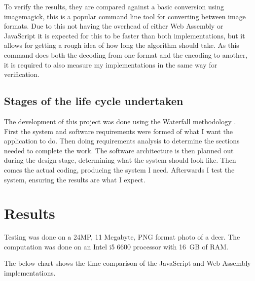 \documentclass[12pt,a4paper]{article}
\begin{document}
To verify the results, they are compared against a basic conversion using imagemagick, this is a popular command line tool for converting between image formats. Due to this not having the overhead of either Web Assembly or JavaScript it is expected for this to be faster than both implementations, but it allows for getting a rough idea of how long the algorithm should take. As this command does both the decoding from one format and the encoding to another, it is required to also measure my implementations in the same way for verification.

\subsection{Stages of the life cycle undertaken}

The development of this project was done using the Waterfall methodology \cite{royce1987managing}. First the system and software requirements were formed of what I want the application to do. Then doing requirements analysis to determine the sections needed to complete the work. The software architecture is then planned out during the design stage, determining what the system should look like. Then comes the actual coding, producing the system I need. Afterwards I test the system, ensuring the results are what I expect.


\section{Results}

Testing was done on a 24MP, 11 Megabyte, PNG format photo of a deer. The computation was done on an Intel i5 6600 processor with 16 GB of RAM.


The below chart shows the time comparison of the JavaScript and Web Assembly implementations.
\end{document}
